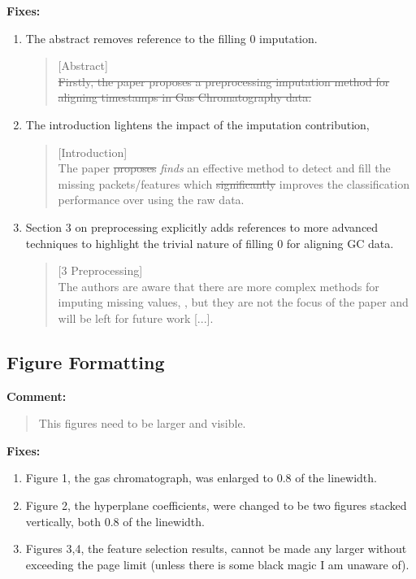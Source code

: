 \documentclass[runningheads]{llncs}
\begin{document}
\noindent\textbf{Fixes:}

\begin{enumerate}
  \item The abstract removes reference to the filling 0 imputation. 
  \begin{quote}
    [Abstract] \\ 
    \sout{Firstly, the paper proposes a preprocessing imputation method for aligning timestamps in Gas Chromatography data.}
  \end{quote}
  \item The introduction lightens the impact of the imputation contribution, 
  \begin{quote}
    [Introduction] \\ 
    The paper \sout{proposes} \emph{finds} an effective method to detect and fill the missing packets/features which \sout{significantly} improves the classification performance over using the raw data.
  \end{quote}
  \item Section 3 on preprocessing explicitly adds references to more advanced techniques to highlight the trivial nature of filling 0 for aligning GC data.
  \begin{quote}
    [3 Preprocessing] \\ 
    The authors are aware that there are more complex methods for imputing missing values, \emph{\cite{tomasi2004correlation,zhang2008two}}, but they are not the focus of the paper and will be left for future work [...].
  \end{quote}
\end{enumerate}

\subsection{Figure Formatting}

\textbf{Comment:}

\begin{quote}
  This figures need to be larger and visible.
\end{quote} 

\noindent\textbf{Fixes:}

\begin{enumerate}
  \item Figure 1, the gas chromatograph, was enlarged to 0.8 of the linewidth. 
  \item Figure 2, the hyperplane coefficients, were changed to be two figures stacked vertically, both 0.8 of the linewidth. 
  \item Figures 3,4, the feature selection results, cannot be made any larger without exceeding the page limit (unless there is some black magic I am unaware of).
\end{enumerate}
\end{document}
